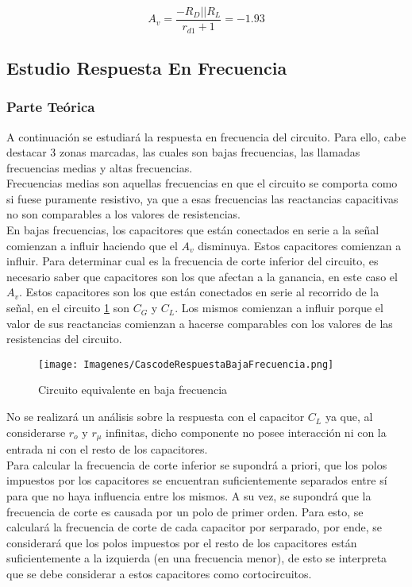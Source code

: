 \documentclass[a4paper,10pt]{article}
\begin{document}
			\begin{equation}
				A_v =\frac{-R_D || R_L}{r_{d1}+1}=-1.93 \label{eq010}
			\end{equation}

		\subsection{Estudio Respuesta En Frecuencia}
			\subsubsection{Parte Teórica}
				A continuación se estudiará la respuesta en frecuencia del circuito. Para ello, cabe destacar 3 zonas marcadas, las cuales son bajas frecuencias, 
				las llamadas frecuencias medias y altas frecuencias. \\
				\indent Frecuencias medias son aquellas frecuencias en que el circuito se comporta como si fuese puramente resistivo, ya que a esas frecuencias las 
				reactancias capacitivas no son comparables a los valores de resistencias. \\
				\indent En bajas frecuencias, los capacitores que están conectados en serie a la señal comienzan a influir haciendo que el $A_v$ disminuya. Estos 
				capacitores comienzan a influir.
				\indent Para determinar cual es la frecuencia de corte inferior del circuito, es necesario saber que capacitores son los que afectan a la ganancia, 
				en este caso el $A_v$. Estos capacitores son los que están conectados en serie al recorrido de la señal, en el circuito \ref{pimg004} son 
				$C_G$ y $C_L$. Los mismos comienzan a influir porque el valor de sus reactancias comienzan a hacerse comparables con los valores de las 
				resistencias del circuito. \\
				
				\begin{figure}[!htb]
					\centering
						\texttt{[image: Imagenes/CascodeRespuestaBajaFrecuencia.png]}
						\caption{Circuito equivalente en baja frecuencia} \label{pimg004}
				\end{figure}
				
				\indent No se realizará un análisis sobre la respuesta con el capacitor $C_L$ ya que, al considerarse $r_o$ y $r_\mu$ infinitas, dicho componente 
				no posee interacción ni con la entrada ni con el resto de los capacitores. \\
				\indent Para calcular la frecuencia de corte inferior se supondrá a priori, que los polos impuestos por los capacitores se encuentran suficientemente 
				separados entre sí para que no haya influencia entre los mismos. A su vez, se supondrá que la frecuencia de corte es causada por un polo de primer 
				orden. Para esto, se calculará la frecuencia de corte de cada capacitor por serparado, por ende, se considerará que los polos impuestos por el 
				resto de los capacitores están suficientemente a la izquierda (en una frecuencia menor), de esto se interpreta que se debe considerar a estos 
				capacitores como cortocircuitos. \\\\
				
\end{document}

